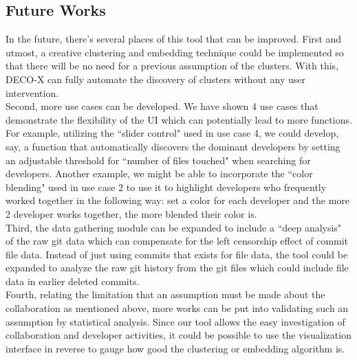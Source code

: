 \documentclass{article}
\begin{document}
\subsection{Future Works}
In the future, there's several places of this tool that can be improved. First and utmost, a creative clustering and embedding technique could be implemented so that there will be no need for a previous assumption of the clusters. With this, DECO-X can fully automate the discovery of clusters without any user intervention.\\
Second, more use cases can be developed. We have shown 4 use cases that demonstrate the flexibility of the UI which can potentially lead to more functions. For example, utilizing the ``slider control" used in use case 4, we could develop, say, a function that automatically discovers the dominant developers by setting an adjustable threshold for ``number of files touched" when searching for developers. Another example, we might be able to incorporate the ``color blending" used in use case 2 to use it to highlight developers who frequently worked together in the following way: set a color for each developer and the more 2 developer works together, the more blended their color is.\\
Third, the data gathering module can be expanded to include a ``deep analysis" of the raw git data which can compensate for the left censorship effect of commit file data. Instead of just using commits that exists for file data, the tool could be expanded to analyze the raw git history from the git files which could include file data in earlier deleted commits.\\
Fourth, relating the limitation that an assumption must be made about the collaboration as mentioned above, more works can be put into validating such an assumption by statistical analysis. Since our tool allows the easy investigation of collaboration and developer activities, it could be possible to use the visualization interface in reverse to gauge how good the clustering or embedding algorithm is.


\end{document}
